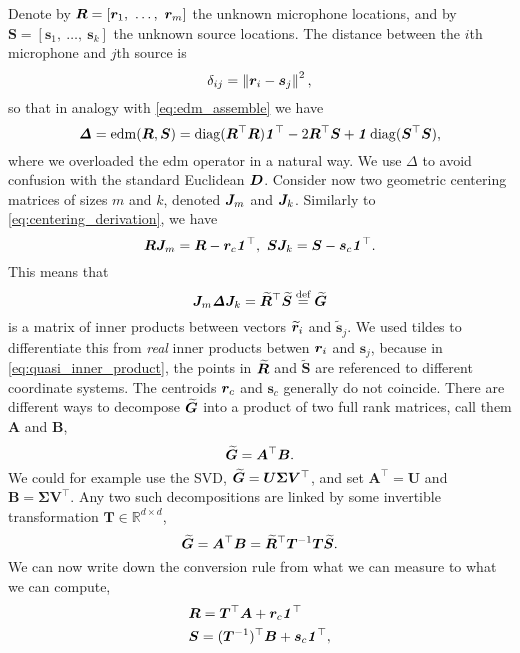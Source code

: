 \documentclass[10pt,double]{IEEEtran}
\providecommand{\R}{\ensuremath{\mathbb{R}}}
\providecommand{\norm}[1]{\left\lVert#1\right\rVert}
\providecommand{\bydef}{\overset{\text{def}}{=}}
\providecommand{\diag}{\mathop{\mathrm{diag}}}
\renewcommand{\vec}[1]{\ensuremath{\boldsymbol{#1}}}
\providecommand{\mat}[1]{\ensuremath{\boldsymbol{#1}}}
\providecommand{\wt}[1]{\ensuremath{\widetilde{#1}}}
\providecommand{\mA}{\mat{A}} \providecommand{\mB}{\mat{B}}
\providecommand{\mS}{\mat{S}} \providecommand{\mU}{\mat{U}}
\providecommand{\mV}{\mat{V}} \providecommand{\mT}{\mat{T}}
\providecommand{\mSigma}{\mat{\Sigma}}
\providecommand{\vs}{\vec{s}}
\newcommand{\EDM}{\ensuremath{\mathrm{edm}}}
\newcommand{\vone}{\ensuremath{\vec{\mathit{1}}}}
\newcommand{\T}{\ensuremath{\top}}
\newcommand{\mDelta}{\bm{\mathit{\Delta}}}
\renewcommand{\diag}{\mathop{\mathrm{diag}}}
\begin{document}
Denote by $\mR = [\vr_1, \ \ldots, \ \vr_m]$ the unknown microphone locations,
and by $\mS = [\vs_1, \ \ldots, \ \vs_k]$ the unknown source locations. The
distance between the $i$th microphone and $j$th source is
\begin{equation}
	\delta_{ij} = \norm{\vr_i - \vs_j}^2,
\end{equation}
so that in analogy with \eqref{eq:edm_assemble} we have 
\begin{equation}
	\mDelta = \EDM(\mR, \mS) = \diag(\mR^\T \mR) \vone^\T - 2 \mR^\T \mS + \vone \diag(\mS^\T \mS),
\end{equation}
where we overloaded the $\EDM$ operator in a natural way. We use $\mDelta$ to
avoid confusion with the standard Euclidean $\mD$. Consider now two geometric
centering matrices of sizes $m$ and $k$, denoted $\mJ_m$ and $\mJ_k$. Similarly to \eqref{eq:centering_derivation}, we have
\begin{equation}
	\mR \mJ_m = \mR - \vr_c \vone^\T,\ \mS \mJ_k = \mS - \vs_c \vone^\T.
\end{equation}
This means that
\begin{equation}
	\label{eq:quasi_inner_product}
	\mJ_m \mDelta \mJ_k = \wt{\mR}^\T \wt{\mS} \bydef \wt{\mG}
\end{equation}
is a matrix of inner products between vectors $\wt{\vr}_i$ and $\wt{\vs}_j$.
We used tildes to differentiate this from \emph{real} inner products betwen
$\vr_i$ and $\vs_j$, because in \eqref{eq:quasi_inner_product}, the points in
$\wt{\mR}$ and $\wt{\mS}$ are referenced to different coordinate systems. The
centroids $\vr_c$ and $\vs_c$ generally do not coincide. There are different
ways to decompose $\wt{\mG}$ into a product of two full rank matrices, call
them $\mA$ and $\mB$,
\begin{equation}
	\label{eq:quasi_gram_decomposition_AB}
	\wt{\mG} = \mA^\T \mB.
\end{equation}
We could for example use the SVD, $\wt{\mG} = \mU \mSigma \mV^\T$, and set
$\mA^\T = \mU$ and $\mB = \mSigma \mV^\T$. Any two such decompositions are
linked by some invertible transformation $\mT \in \R^{d \times d}$,
\begin{equation}
	\wt{\mG} = \mA^\T \mB = \wt{\mR}^\T \mT^{-1} \mT \wt{\mS}.
\end{equation}
We can now write down the conversion rule from what we can measure to what we
can compute,
\begin{equation}
\begin{aligned}
	&\mR = \mT^\T \mA + \vr_c \vone^\T \\
	&\mS = (\mT^{-1})^\T \mB + \vs_c \vone^\T,
\end{aligned}
\end{equation}
\end{document}
